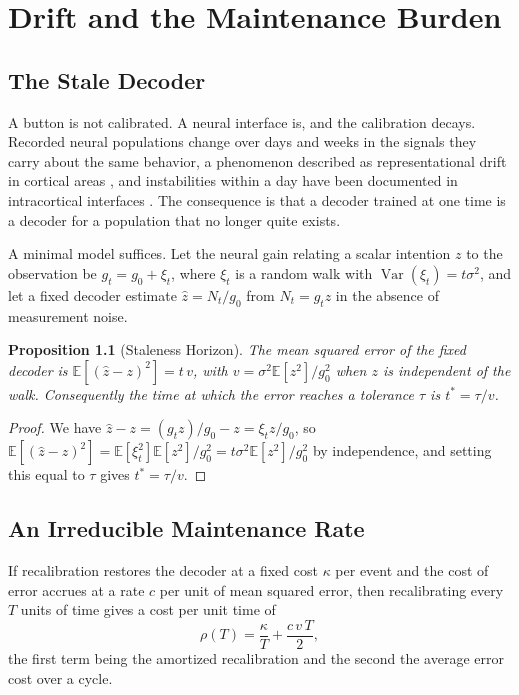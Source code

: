 \documentclass[11pt,twoside,openany]{book}
\newtheorem{proposition}[theorem]{Proposition}
\theoremstyle{definition}
\theoremstyle{remark}
\newcommand{\E}{\mathbb{E}}
\begin{document}
\chapter{Drift and the Maintenance Burden}

\section{The Stale Decoder}

A button is not calibrated. A neural interface is, and the calibration decays. Recorded neural populations change over days and weeks in the signals they carry about the same behavior, a phenomenon described as representational drift in cortical areas \cite{driscoll2017}, and instabilities within a day have been documented in intracortical interfaces \cite{perge2013}. The consequence is that a decoder trained at one time is a decoder for a population that no longer quite exists.

A minimal model suffices. Let the neural gain relating a scalar intention $z$ to the observation be $g_t=g_0+\xi_t$, where $\xi_t$ is a random walk with $\operatorname{Var}(\xi_t)=t\sigma^{2}$, and let a fixed decoder estimate $\hat z=N_t/g_0$ from $N_t=g_t z$ in the absence of measurement noise.

\begin{proposition}[Staleness Horizon]\label{prop:stale}
The mean squared error of the fixed decoder is $\E\left[(\hat z-z)^{2}\right]=t\,v$, with $v=\sigma^{2}\E[z^{2}]/g_0^{2}$ when $z$ is independent of the walk. Consequently the time at which the error reaches a tolerance $\tau$ is $t^{*}=\tau/v$.
\end{proposition}
\begin{proof}
We have $\hat z-z=(g_t z)/g_0-z=\xi_t z/g_0$, so $\E[(\hat z-z)^{2}]=\E[\xi_t^{2}]\E[z^{2}]/g_0^{2}=t\sigma^{2}\E[z^{2}]/g_0^{2}$ by independence, and setting this equal to $\tau$ gives $t^{*}=\tau/v$.
\end{proof}

\section{An Irreducible Maintenance Rate}

If recalibration restores the decoder at a fixed cost $\kappa$ per event and the cost of error accrues at a rate $c$ per unit of mean squared error, then recalibrating every $T$ units of time gives a cost per unit time of
\[
\rho(T)=\frac{\kappa}{T}+\frac{c\,v\,T}{2},
\]
the first term being the amortized recalibration and the second the average error cost over a cycle.
\end{document}
